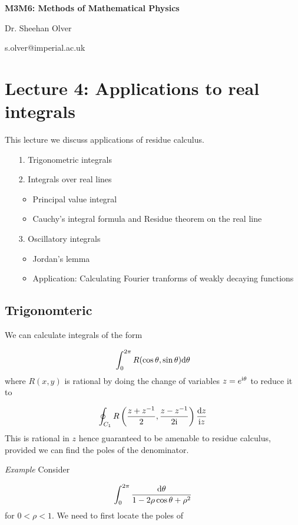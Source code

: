 \documentclass[12pt,a4paper]{article}
\def\D{ {\rm d} }
\def\I{ {\rm i} }
\begin{document}
\textbf{M3M6: Methods of Mathematical Physics}

Dr. Sheehan Olver

s.olver@imperial.ac.uk

\section{Lecture 4: Applications to real integrals}
This lecture we discuss applications of residue calculus. 

\begin{itemize}
\item[1. ] Trigonometric integrals


\item[2. ] Integrals over real lines

\begin{itemize}
\item Principal value integral


\item Cauchy's integral formula and Residue theorem on the real line

\end{itemize}

\item[3. ] Oscillatory integrals

\begin{itemize}
\item Jordan's lemma


\item Application: Calculating Fourier tranforms of weakly decaying functions

\end{itemize}
\end{itemize}
\subsection{Trigonomteric}
We can calculate integrals of the form 

\[
\int_0^{2 \pi} R(\cos \theta, \sin \theta) \D \theta
\]
where $R(x,y)$ is rational by doing the change of variables $z = e^{\I \theta}$ to reduce it to

\[
\oint_{C_1} R\left({z + z^{-1} \over 2}, {z - z^{-1} \over 2 \I} \right) {\D z \over \I z}
\]
This is rational in $z$ hence guaranteed to be amenable to residue calculus, provided we can find the poles of the denominator. 

\emph{Example} Consider

\[
\int_0^{2\pi} {\D \theta \over 1 - 2\rho \cos \theta + \rho^2}
\]
for $0 < \rho < 1$. We need to first locate the poles of 
\end{document}
